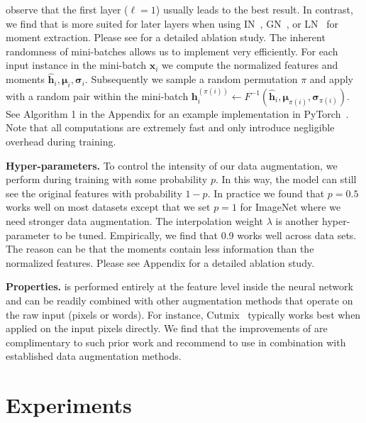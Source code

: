 \documentclass[final]{cvpr}
\begin{document}
observe that the first layer ($\ell=1$) usually leads to the best result. In contrast, we find that \methodname{} is more suited for later layers when using IN~\citep{ulyanov2016instance}, GN~\citep{wu2018group}, or LN~\citep{ba2016layer} for moment extraction. 
Please see  for a detailed ablation study. 
The inherent randomness of mini-batches allows us to implement \methodname{} very efficiently. For each input instance in the mini-batch $\mathbf{x}_i$ we compute the normalized features and moments  $\hat{\mathbf{h}}_i,\boldsymbol{\mu}_i,\boldsymbol{\sigma}_i$. Subsequently we sample a random permutation $\pi$ and apply \methodname{} with a random pair within the mini-batch
\(
    \mathbf{h}_i^{\left(\pi(i)\right)}\leftarrow 
    F^{-1}({\hat{\mathbf{h}}}_i,\boldsymbol{\mu}_{\pi(i)},\boldsymbol{\sigma}_{\pi(i)}).
\)
See Algorithm 1 in the Appendix for an example implementation in PyTorch~\citep{paszke2017automatic}. Note that all computations are extremely fast and only introduce negligible overhead during training. 


\textbf{Hyper-parameters.}
To control the intensity of our data augmentation, we perform \methodname{} during training with some probability $p$. In this way, the model can still see the original features with probability $1 - p$. In practice we found that $p = 0.5$ works well on most datasets except that we set $p = 1$ for ImageNet where we need stronger data augmentation.
The interpolation weight $\lambda$ is another hyper-parameter to be tuned. Empirically, we find that 0.9 works well across data sets. The reason can be that the moments contain less information than the normalized features.
Please see Appendix for a detailed ablation study. 


\textbf{Properties.} \methodname{} is performed entirely at the feature level inside the neural network and can be readily combined with other augmentation methods that operate on the raw input (pixels or words). For instance,  Cutmix~\cite{yun2019cutmix} typically works best when applied on the input pixels directly. We find that the improvements of \methodname{} are complimentary to such prior work and recommend to use \methodname{} in combination with established data augmentation methods. 

\vspace{-0.1in}



 \section{Experiments}
\label{sec:exp}
\end{document}
